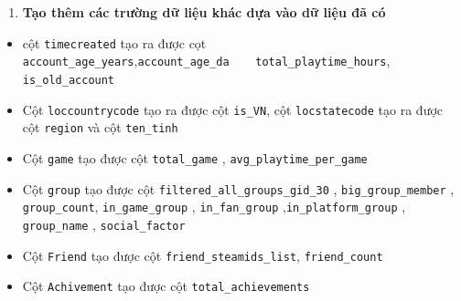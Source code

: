 \documentclass[
  11pt,
]{article}
\providecommand{\tightlist}{%
  \setlength{\itemsep}{0pt}\setlength{\parskip}{0pt}}
\begin{document}
\begin{enumerate}
  \begin{itemize}
  \tightlist
  \item
    Mỗi hàng = 1 người dùng.\\
  \item
    Các cột đặc trưng:

    \begin{itemize}
    \tightlist
    \item
      \textbf{Thông tin cơ bản}: \texttt{user\_id},
      \texttt{account\_age\_years}, \texttt{loccountrycode}.\\
    \item
      \textbf{Hoạt động chơi game}: \texttt{total\_games},
      \texttt{total\_playtime\_hours},
      \texttt{avg\_playtime\_per\_game}.\\
    \item
      \textbf{Thành tựu}: \texttt{total\_achievements}.\\
    \item
      \textbf{Xã hội}: \texttt{friends\_count}, \texttt{group\_count},
      \texttt{social\_factor}.\\
    \item
      \textbf{Group Membership}: vector nhị phân từ \texttt{gid}.
    \end{itemize}
  \end{itemize}
\item
  \textbf{Tạo thêm các trường dữ liệu khác dựa vào dữ liệu đã có}
\end{enumerate}

\begin{itemize}
\item
  cột \texttt{timecreated} tạo ra được cọt
  \texttt{account\_age\_years},\texttt{account\_age\_da\ \ \ \ total\_playtime\_hours},
  \texttt{is\_old\_account}
\item
  Cột \texttt{loccountrycode} tạo ra được cột \texttt{is\_VN}, cột
  \texttt{locstatecode} tạo ra được cột \texttt{region} và cột
  \texttt{ten\_tinh}
\item
  Cột \texttt{game} tạo được cột \texttt{total\_game} ,
  \texttt{avg\_playtime\_per\_game}
\item
  Cột \texttt{group} tạo được cột
  \texttt{filtered\_all\_groups\_gid\_30} , \texttt{big\_group\_member}
  , \texttt{group\_count}, \texttt{in\_game\_group} ,
  \texttt{in\_fan\_group} ,\texttt{in\_platform\_group} ,
  \texttt{group\_name} , \texttt{social\_factor}
\item
  Cột \texttt{Friend} tạo được cột \texttt{friend\_steamids\_list},
  \texttt{friend\_count}
\item
  Cột \texttt{Achivement} tạo được cột \texttt{total\_achievements}
\end{itemize}
\end{document}
